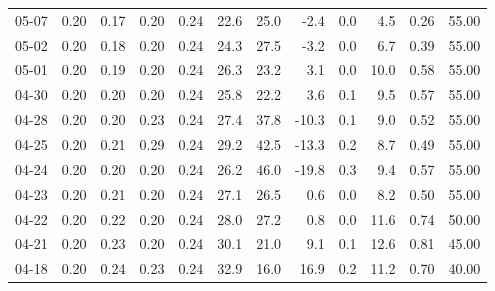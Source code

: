 \begin{threeparttable}
{\begin{tabular}{lrrrrrrrrrrr}
  05-07 &          0.20 &          0.17 &          0.20 &        0.24 &                22.6 &                25.0 &       -2.4 &                 0.0 &              4.5 &            0.26 &                  55.00 \\
  05-02 &          0.20 &          0.18 &          0.20 &        0.24 &                24.3 &                27.5 &       -3.2 &                 0.0 &              6.7 &            0.39 &                  55.00 \\
  05-01 &          0.20 &          0.19 &          0.20 &        0.24 &                26.3 &                23.2 &        3.1 &                 0.0 &             10.0 &            0.58 &                  55.00 \\
  04-30 &          0.20 &          0.20 &          0.20 &        0.24 &                25.8 &                22.2 &        3.6 &                 0.1 &              9.5 &            0.57 &                  55.00 \\
  04-28 &          0.20 &          0.20 &          0.23 &        0.24 &                27.4 &                37.8 &      -10.3 &                 0.1 &              9.0 &            0.52 &                  55.00 \\
  04-25 &          0.20 &          0.21 &          0.29 &        0.24 &                29.2 &                42.5 &      -13.3 &                 0.2 &              8.7 &            0.49 &                  55.00 \\
  04-24 &          0.20 &          0.20 &          0.20 &        0.24 &                26.2 &                46.0 &      -19.8 &                 0.3 &              9.4 &            0.57 &                  55.00 \\
  04-23 &          0.20 &          0.21 &          0.20 &        0.24 &                27.1 &                26.5 &        0.6 &                 0.0 &              8.2 &            0.50 &                  55.00 \\
  04-22 &          0.20 &          0.22 &          0.20 &        0.24 &                28.0 &                27.2 &        0.8 &                 0.0 &             11.6 &            0.74 &                  50.00 \\
  04-21 &          0.20 &          0.23 &          0.20 &        0.24 &                30.1 &                21.0 &        9.1 &                 0.1 &             12.6 &            0.81 &                  45.00 \\
  04-18 &          0.20 &          0.24 &          0.23 &        0.24 &                32.9 &                16.0 &       16.9 &                 0.2 &             11.2 &            0.70 &                  40.00 \\

\end{tabular}}
\end{threeparttable}
